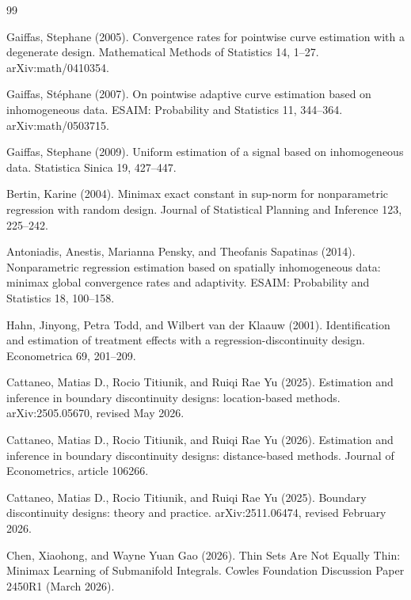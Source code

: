 \documentclass{article}
\begin{document}
\begin{thebibliography}{99}

   Gaiffas, Stephane (2005). Convergence rates for pointwise curve estimation with a degenerate design. Mathematical Methods of Statistics 14, 1--27. arXiv:math/0410354.

   Gaiffas, Stéphane (2007). On pointwise adaptive curve estimation based on inhomogeneous data. ESAIM: Probability and Statistics 11, 344--364. arXiv:math/0503715.

   Gaiffas, Stephane (2009). Uniform estimation of a signal based on inhomogeneous data. Statistica Sinica 19, 427--447.

   Bertin, Karine (2004). Minimax exact constant in sup-norm for nonparametric regression with random design. Journal of Statistical Planning and Inference 123, 225--242.

   Antoniadis, Anestis, Marianna Pensky, and Theofanis Sapatinas (2014). Nonparametric regression estimation based on spatially inhomogeneous data: minimax global convergence rates and adaptivity. ESAIM: Probability and Statistics 18, 100--158.

   Hahn, Jinyong, Petra Todd, and Wilbert van der Klaauw (2001). Identification and estimation of treatment effects with a regression-discontinuity design. Econometrica 69, 201--209.

   Cattaneo, Matias D., Rocio Titiunik, and Ruiqi Rae Yu (2025). Estimation and inference in boundary discontinuity designs: location-based methods. arXiv:2505.05670, revised May 2026.

   Cattaneo, Matias D., Rocio Titiunik, and Ruiqi Rae Yu (2026). Estimation and inference in boundary discontinuity designs: distance-based methods. Journal of Econometrics, article 106266.

   Cattaneo, Matias D., Rocio Titiunik, and Ruiqi Rae Yu (2025). Boundary discontinuity designs: theory and practice. arXiv:2511.06474, revised February 2026.

   Chen, Xiaohong, and Wayne Yuan Gao (2026). Thin Sets Are Not Equally Thin: Minimax Learning of Submanifold Integrals. Cowles Foundation Discussion Paper 2450R1 (March 2026).

\end{thebibliography}
\end{document}
